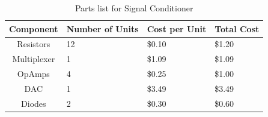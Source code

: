\begin{table}[hbp]
\caption[Signal Conditioner parts]{Parts list for Signal Conditioner}
\begin{center}
\begin{tabular}{c | l | l | l}
	Component & Number of Units & Cost per Unit & Total Cost \\\hline
	Resistors & 12 & \$0.10 & \$1.20 \\ 
	Multiplexer & 1 & \$1.09 & \$1.09 \\
	OpAmps & 4 & \$0.25 & \$1.00 \\
	DAC & 1 & \$3.49 & \$3.49 \\
	Diodes & 2 & \$0.30 & \$0.60
\end{tabular}
\end{center}
\label{tab:analog input parts}
\end{table}
